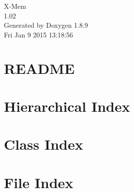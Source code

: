 \documentclass[twoside]{book}
\newcommand{\+}{\discretionary{\mbox{\scriptsize$\hookleftarrow$}}{}{}}
\newcommand{\clearemptydoublepage}{%
  \newpage{\pagestyle{empty}\cleardoublepage}%
}
\begin{document}
\hypersetup{pageanchor=false,
             bookmarks=true,
             bookmarksnumbered=true,
             pdfencoding=unicode
            }
\begin{titlepage}
\vspace*{7cm}
\begin{center}%
{\Large X-\/\+Mem \\[1ex]\large 1.\+02 }\\
\vspace*{1cm}
{\large Generated by Doxygen 1.8.9}\\
\vspace*{0.5cm}
{\small Fri Jan 9 2015 13:18:56}\\
\end{center}
\end{titlepage}
\clearemptydoublepage
\tableofcontents
\clearemptydoublepage
{}
\hypersetup{pageanchor=true}

\chapter{R\+E\+A\+D\+M\+E}
\label{md_src__r_e_a_d_m_e}
\hypertarget{md_src__r_e_a_d_m_e}{}

\chapter{Hierarchical Index}

\chapter{Class Index}

\chapter{File Index}

\end{document}
